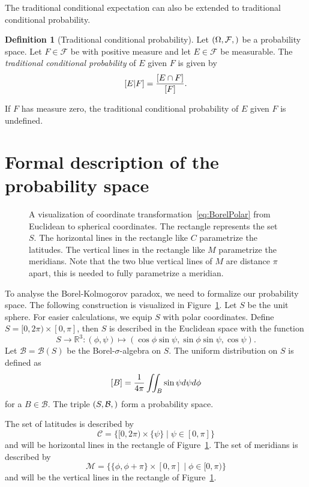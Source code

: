 \documentclass[a4paper]{report}
\theoremstyle{plain}
\theoremstyle{definition}
\newtheorem{definition}[theorem]{Definition}
\theoremstyle{remark}
\numberwithin{equation}{chapter}
\newcommand{\R}{\mathbb{R}}
\let\P\relax
\DeclareMathOperator{\P}{\mathbb{P}}
\DeclareMathOperator{\1}{\mathbbm{1}}
\newcommand{\F}{\mathcal{F}}
\newcommand{\B}{\mathcal{B}}
\begin{document}
The traditional conditional expectation can also be extended to traditional conditional probability.
\begin{definition}[Traditional conditional probability]
Let $(\Omega,\F, \P)$ be a probability space. Let $F\in\F$ be with positive measure and let $E\in\F$ be measurable. The \emph{traditional conditional probability} of $E$ given $F$ is given by
\begin{equation}
\P[E|F]=\frac{\P[E\cap F]}{\P[F]}.
\end{equation}

If $F$ has measure zero, the traditional conditional probability of $E$ given $F$ is undefined.
\end{definition}

\section{Formal description of the probability space}
\begin{figure}
\centering{

}
\caption{A visualization of coordinate transformation~\eqref{eq:BorelPolar} from Euclidean to spherical coordinates. The rectangle represents the set $S$. The horizontal lines in the rectangle like $C$ parametrize the latitudes. The vertical lines in the rectangle like $M$ parametrize the meridians. Note that the two blue vertical lines of $M$ are distance $\pi$ apart, this is needed to fully parametrize a meridian.}
\label{fig:BorelVis}
\end{figure}

To analyse the Borel-Kolmogorov paradox, we need to formalize our probability space. The following construction is visualized in Figure~\ref{fig:BorelVis}. Let $S$ be the unit sphere. For easier calculations, we equip $S$ with polar coordinates. Define $S=[0,2\pi)\times[0,\pi]$, then $S$ is described in the Euclidean space with the function
\begin{equation}\label{eq:BorelPolar}
S\to\R^3:(\phi,\psi)\mapsto(\cos\phi\sin\psi,\sin\phi\sin\psi,\cos\psi).
\end{equation}
Let $\B=\B(S)$ be the Borel-$\sigma$-algebra on $S$. The uniform distribution on $S$ is defined as
\begin{equation}
\P[B]=\frac{1}{4\pi}\iint_B\sin\psi d\psi d\phi
\end{equation}
for a $B\in\B$. The triple $(S,\B,\P)$ form a probability space.

The set of latitudes is described by
\begin{equation}
\mathcal{C}=\{[0,2\pi)\times\{\psi\}\mid\psi\in[0,\pi]\}
\end{equation}
and will be horizontal lines in the rectangle of Figure~\ref{fig:BorelVis}. The set of meridians is described by
\begin{equation}
\mathcal{M}=\{\{\phi,\phi+\pi\}\times[0,\pi]\mid\phi\in[0,\pi)\}
\end{equation}
and will be the vertical lines in the rectangle of Figure~\ref{fig:BorelVis}.
\end{document}
